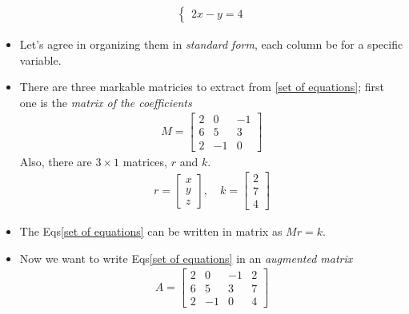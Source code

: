 \begin{itemize}
\begin{align}
\begin{cases}
                        2x - y = 4
                    \end{cases}
                \end{align}
                \item Let's agree in organizing them in \textit{standard form}, each column be for a specific variable.
                \item There are three markable matricies to extract from \eqref{set of equations}; 
                first one is the \textit{matrix of the coefficients}
                \begin{align} \label{matrix of the coefficiants}
                    M= \begin{bmatrix}
                        2 & 0 & -1 \\
                        6 & 5 & 3 \\
                        2 & -1 & 0
                    \end{bmatrix}
                \end{align}
                Also, there are $3\times1$ matrices, $r$ and $k$.
                \begin{align}
                    r= \begin{bmatrix}
                        x \\ y \\ z
                    \end{bmatrix}, \quad
                    k= \begin{bmatrix}
                        2 \\ 7 \\ 4
                    \end{bmatrix}
                \end{align}
                \item The Eqs\eqref{set of equations} can be written in matrix as $Mr=k$.
                \item Now we want to write Eqs\eqref{set of equations} in an \textit{augmented matrix}
                \begin{align} \label{augmented matrix}
                    A= \begin{bmatrix}
                        2 & 0 & -1 & 2 \\
                        6 & 5 & 3 & 7 \\
                        2 & -1 & 0 & 4
                    \end{bmatrix}
                \end{align}

\end{itemize}

